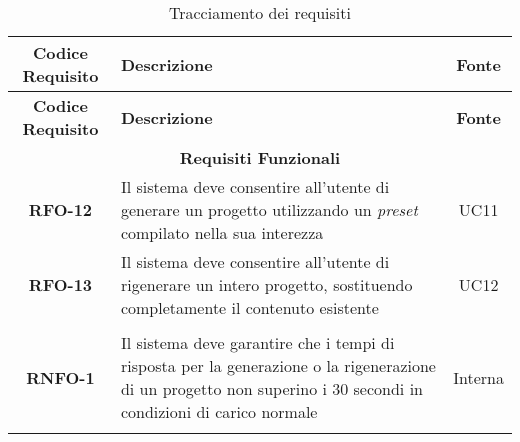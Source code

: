 \renewcommand{\arraystretch}{1.5} %

\begin{longtable}{|c|>{\centering\arraybackslash}p{}|c|} %
    \hline
    \rowcolor{green!30} %
    \textbf{Codice Requisito} & \textbf{Descrizione} & \textbf{Fonte} \\
    \hline
    \endfirsthead %
    
    \hline
    \rowcolor{green!30} %
    \textbf{Codice Requisito} & \textbf{Descrizione} & \textbf{Fonte} \\
    \hline
    \endhead %
    
    \hline
    \multicolumn{3}{|c|}{\rowcolor{green!30} \textbf{Requisiti Funzionali}} \\
    \hline
    \textbf{RFO-12} & Il sistema deve consentire all'utente di generare un progetto utilizzando un \textit{preset} compilato nella sua interezza & UC11 \\
    \hline
    \textbf{RFO-13} & Il sistema deve consentire all'utente di rigenerare un intero progetto, sostituendo completamente il contenuto esistente & UC12 \\
    \hline
    \pagebreak
    \hline
    \multicolumn{3}{|c|}{\rowcolor{green!30} \textbf{Requisiti Non Funzionali}} \\
    \hline %
    \textbf{RNFO-1} & Il sistema deve garantire che i tempi di risposta per la generazione o la rigenerazione di un progetto non superino i 30 secondi in condizioni di carico normale & Interna \\
    \hline
    \caption{Tracciamento dei requisiti} %
    \label{tab:requisiti-stage} %
\end{longtable}